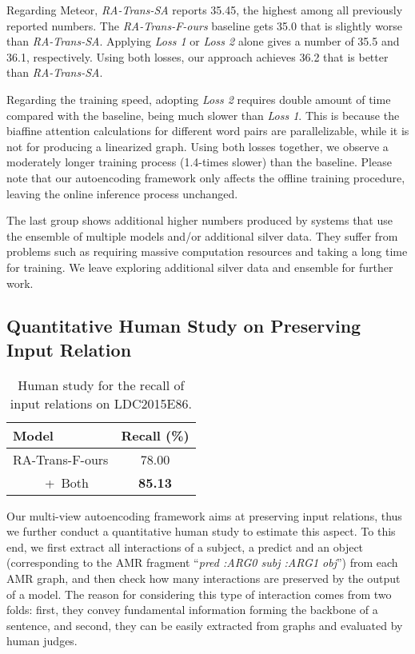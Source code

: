 \documentclass[11pt,a4paper]{article}
\begin{document}
Regarding Meteor, \emph{RA-Trans-SA} reports 35.45, the highest among all previously reported numbers.
The \emph{RA-Trans-F-ours} baseline gets 35.0 that is slightly worse than \emph{RA-Trans-SA}.
Applying \emph{Loss 1} or \emph{Loss 2} alone gives a number of 35.5 and 36.1, respectively.
Using both losses, our approach achieves 36.2 that is better than \emph{RA-Trans-SA}.


Regarding the training speed, adopting \emph{Loss 2} requires double amount of time compared with the baseline, being much slower than \emph{Loss 1}.
This is because the biaffine attention calculations for different word pairs are parallelizable, while it is not for producing a linearized graph.
Using both losses together, we observe a moderately longer training process (1.4-times slower) than the baseline.
Please note that our autoencoding framework only affects the offline training procedure, leaving the online inference process unchanged.


The last group shows additional higher numbers produced by systems that use the ensemble of multiple models and/or additional silver data.
They suffer from problems such as requiring massive computation resources and taking a long time for training.
We leave exploring additional silver data and ensemble for further work.


\subsection{Quantitative Human Study on Preserving Input Relation}


\begin{table}
    \centering
    \begin{tabular}{lc}
    \toprule
    Model & Recall (\%) \\
    \midrule
    RA-Trans-F-ours & 78.00 \\
    ~~~~~+~Both & \textbf{85.13} \\
    \bottomrule
    \end{tabular}
    \caption{Human study for the recall of input relations on LDC2015E86.}
    \label{tab:human_study}
    \vspace{-1.0em}
\end{table}


Our multi-view autoencoding framework aims at preserving input relations, thus we further conduct a quantitative human study to estimate this aspect.
To this end, we first extract all interactions of a subject, a predict and an object (corresponding to the AMR fragment ``\emph{pred :ARG0 subj :ARG1 obj}'') from each AMR graph, and then check how many interactions are preserved by the output of a model.
The reason for considering this type of interaction comes from two folds: first, they convey fundamental information forming the backbone of a sentence, and second, 
they can be easily extracted from graphs and evaluated by human judges.
\end{document}
